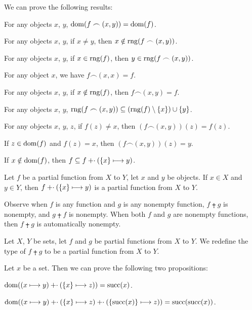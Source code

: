 \documentclass{article}
\begin{document}
We can prove the following results:
\begin{thm}
\item\label{funct4:99} For any objects $x$, $y$,
  $\operatorname{dom}(f\frown(x,y))=\operatorname{dom}(f)$.
\item\label{funct4:100} For any objects $x$, $y$,
  if $x\neq y$, then $x\notin\operatorname{rng}(f\frown(x,y))$.
\item\label{funct4:101} For any objects $x$, $y$,
  if $x\in\operatorname{rng}(f)$, then $y\in\operatorname{rng}(f\frown(x,y))$.
\item\label{funct4:102} For any object $x$, we have $f\frown(x,x)=f$.
\item\label{funct4:103} For any objects $x$, $y$,
  if $x\notin\operatorname{rng}(f)$, then $f\frown(x,y)=f$.
\item\label{funct4:104} For any objects $x$, $y$,
  $\operatorname{rng}(f\frown(x,y))\subseteq(\operatorname{rng}(f)\setminus\{x\})\cup\{y\}$.
\item\label{funct4:105} For any objects $x$, $y$, $z$, if
  $f(z)\neq x$, then $(f\frown(x,y))(z)=f(z)$.
\item\label{funct4:106} If $z\in\operatorname{dom}(f)$ and $f(z)=x$,
  then $(f\frown(x,y))(z)=y$.
\item\label{funct4:107} If $x\notin\operatorname{dom}(f)$,
  then $f\subseteq f\mathbin{\mathord{+}\cdot}(\{x\}\longmapsto y)$.
\item\label{funct4:108} Let $f$ be a partial function from $X$ to $Y$,
  let $x$ and $y$ be objects. If $x\in X$ and $y\in Y$,
  then $f\mathbin{\mathord{+}\cdot}(\{x\}\longmapsto y)$ is a partial function from $X$ to $Y$.
\end{thm}

Observe when $f$ is any function and $g$ is any nonempty function,
$f\plusdot g$ is nonempty, and $g\plusdot f$ is nonempty. When both $f$
and $g$ are nonempty functions, then $f\plusdot g$ is automatically nonempty.

\begin{definition}
Let $X$, $Y$ be sets, let $f$ and $g$ be partial functions from $X$ to $Y$.
We redefine the type of $f\plusdot g$ to be a partial function from $X$
to $Y$.
\end{definition}

Let $x$ be a set. Then we can prove the following two propositions:
\begin{thm}
\item\label{funct4:109} $\operatorname{dom}((x\longmapsto y)\mathbin{\mathord{+}\cdot}(\{x\}\longmapsto z))=\operatorname{succ}(x)$.
\item\label{funct4:110} $\operatorname{dom}((x\longmapsto y)\mathbin{\mathord{+}\cdot}(\{x\}\longmapsto z)\mathbin{\mathord{+}\cdot}(\{\operatorname{succ}(x)\}\longmapsto z))=\operatorname{succ}(\operatorname{succ}(x))$.
\end{thm}
\end{document}
